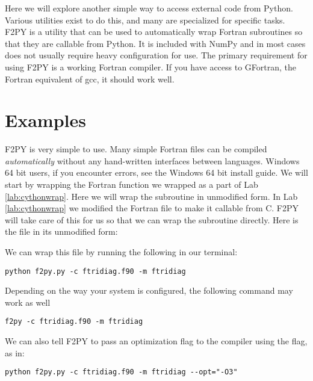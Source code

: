 \label{lab:f2py}

Here we will explore another simple way to access external code from Python.
Various utilities exist to do this, and many are specialized for specific tasks.
F2PY is a utility that can be used to automatically wrap Fortran subroutines so that they are callable from Python.
It is included with NumPy and in most cases does not usually require heavy configuration for use.
The primary requirement for using F2PY is a working Fortran compiler.
If you have access to GFortran, the Fortran equivalent of gcc, it should work well.

\section*{Examples}

F2PY is very simple to use.
Many simple Fortran files can be compiled \emph{automatically} without any hand-written interfaces between languages.
Windows 64 bit users, if you encounter errors, see the Windows 64 bit install guide.
We will start by wrapping the Fortran function we wrapped as a part of Lab \ref{lab:cythonwrap}.
Here we will wrap the subroutine in unmodified form.
In Lab \ref{lab:cythonwrap} we modified the Fortran file to make it callable from C.
F2PY will take care of this for us so that we can wrap the subroutine directly.
Here is the file in its unmodified form:

We can wrap this file by running the following in our terminal:
\begin{lstlisting}[style=ShellInput]
python f2py.py -c ftridiag.f90 -m ftridiag
\end{lstlisting}
Depending on the way your system is configured, the following command may work as well
\begin{lstlisting}[style=ShellInput]
f2py -c ftridiag.f90 -m ftridiag
\end{lstlisting}
We can also tell F2PY to pass an optimization flag to the compiler using the  flag, as in:
\begin{lstlisting}[style=ShellInput]
python f2py.py -c ftridiag.f90 -m ftridiag --opt="-O3"
\end{lstlisting}

